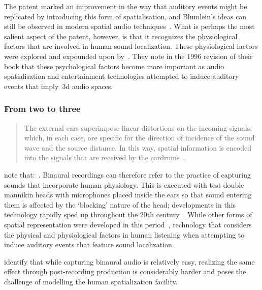 The patent marked an improvement in the way
that auditory events might be replicated by introducing this form of spatialisation, and
Blumlein's ideas can still be observed in modern spatial audio techniques~\citep{spatial_techniques, beyer_acoustics}.
What is perhaps the most salient aspect of the patent, however, is that it recognizes the physiological factors that are involved in human sound localization.
These physiological factors were explored and expounded upon by~\citet{blauert_spatial}.
They note in the 1996 revision of their book that these psychological factors become more important
as audio spatialisation and entertainment technologies attempted to induce auditory events that imply~\gls{3d} audio spaces.

\subsubsection{From two to three}

\begin{quotation}
    The external ears superimpose linear distortions on the incoming signals, which, in each case, are specific for the direction of incidence of the sound wave and the source distance.
    In this way, spatial information is encoded into the signals that are received by the eardrums~\citep{blauert_spatial}.
\end{quotation}

\citet{roginska2017immersive} note that:~.
Binaural recordings can therefore refer to the practice of capturing sounds that incorporate human physiology.
This is executed with test double mannikin heads with microphones placed inside the ears so that sound entering them is affected by the `blocking' nature of the head;
developments in this technology rapidly sped up throughout the 20th century~\citep{binaural_paul}.
While other forms of spatial representation were developed in this period~\citep{gerzon_periphony, noisternig_ambisonic, wave_field}, technology that considers the physical and physiological factors in human listening when attempting to induce auditory events that feature sound localization.

\citet{roginska2017immersive} identify that while capturing binaural audio is relatively easy, realizing the same effect through post-recording production is considerably harder and poses the challenge of modelling the human spatialization facility.

